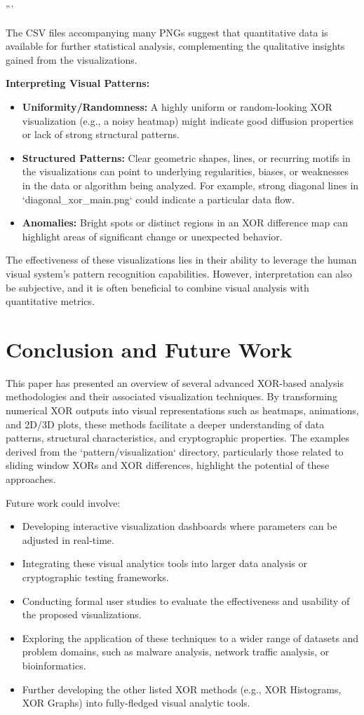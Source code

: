 '''\documentclass[conference]{IEEEtran}
\begin{document}
The CSV files accompanying many PNGs suggest that quantitative data is available for further statistical analysis, complementing the qualitative insights gained from the visualizations.

\textbf{Interpreting Visual Patterns:}
\begin{itemize}
    \item \textbf{Uniformity/Randomness:} A highly uniform or random-looking XOR visualization (e.g., a noisy heatmap) might indicate good diffusion properties or lack of strong structural patterns.
    \item \textbf{Structured Patterns:} Clear geometric shapes, lines, or recurring motifs in the visualizations can point to underlying regularities, biases, or weaknesses in the data or algorithm being analyzed. For example, strong diagonal lines in `diagonal_xor_main.png` could indicate a particular data flow.
    \item \textbf{Anomalies:} Bright spots or distinct regions in an XOR difference map can highlight areas of significant change or unexpected behavior.
\end{itemize}

The effectiveness of these visualizations lies in their ability to leverage the human visual system's pattern recognition capabilities. However, interpretation can also be subjective, and it is often beneficial to combine visual analysis with quantitative metrics.

\section{Conclusion and Future Work} \label{sec:conclusion}
This paper has presented an overview of several advanced XOR-based analysis methodologies and their associated visualization techniques. By transforming numerical XOR outputs into visual representations such as heatmaps, animations, and 2D/3D plots, these methods facilitate a deeper understanding of data patterns, structural characteristics, and cryptographic properties. The examples derived from the `pattern/visualization` directory, particularly those related to sliding window XORs and XOR differences, highlight the potential of these approaches.

Future work could involve:
\begin{itemize}
    \item Developing interactive visualization dashboards where parameters can be adjusted in real-time.
    \item Integrating these visual analytics tools into larger data analysis or cryptographic testing frameworks.
    \item Conducting formal user studies to evaluate the effectiveness and usability of the proposed visualizations.
    \item Exploring the application of these techniques to a wider range of datasets and problem domains, such as malware analysis, network traffic analysis, or bioinformatics.
    \item Further developing the other listed XOR methods (e.g., XOR Histograms, XOR Graphs) into fully-fledged visual analytic tools.
\end{itemize}
\end{document}
